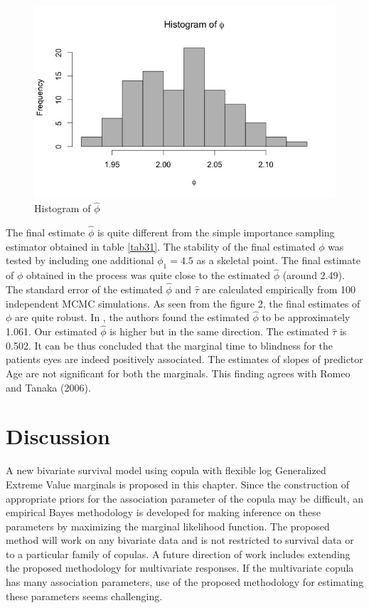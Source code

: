 \documentclass[11pt]{article}
\theoremstyle{remboldstyle}
\begin{document}
\begin{figure}[H]
\begin{center}
\includegraphics[scale=0.4]{plot2_new.jpeg}
\end{center}
\caption{Histogram of $\hat{\phi}$}
\end{figure}
\noindent
The final estimate $\hat{\phi}$ is quite different from the simple importance sampling estimator obtained in table \ref{tab31}. The stability of the final estimated $\phi$ was tested by including one additional $\phi_1 = 4.5$ as a skeletal point. The final estimate of $\phi$ obtained in the process was quite close to the estimated $\hat{\phi}$ (around 2.49). The standard error of the estimated $\hat{\phi}$ and $\hat{\tau}$ are calculated empirically from 100 independent MCMC simulations. As seen from the figure 2, the final estimates of $\phi$ are quite robust. In \cite{romeo:tanaka:2006}, the authors found the estimated $\hat{\phi}$ to be approximately 1.061. Our estimated $\hat{\phi}$ is higher but in the same direction. The estimated $\hat{\tau}$ is 0.502. It can be thus concluded that the marginal time to blindness for the patients eyes are indeed positively associated. The estimates of slopes of predictor Age are not significant for both the marginals. This finding agrees with Romeo and Tanaka (2006). 
\section{Discussion}
\label{sec:dis}
\noindent
A new bivariate survival model using copula with flexible log Generalized Extreme Value marginals is proposed in this chapter. Since the construction of appropriate priors for the association parameter of the copula may be difficult, an empirical Bayes methodology is developed for making inference on these parameters by maximizing the marginal likelihood function. The proposed method will work on any bivariate data and is not restricted to survival data or to a particular family of copulas. A future direction of work includes extending the proposed methodology for multivariate responses. If the multivariate copula has many association parameters, use of the proposed methodology for estimating these parameters seems challenging. 



\end{document}
